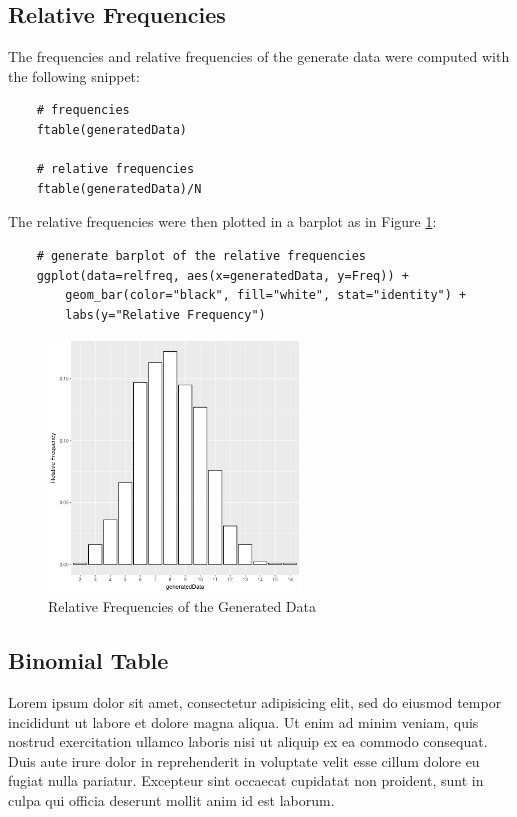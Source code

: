 \documentclass{article}
\begin{document}
        \subsection{Relative Frequencies}
            The frequencies and relative frequencies of the generate data were computed with the following snippet:
\begin{lstlisting}
    # frequencies
    ftable(generatedData)

    # relative frequencies
    ftable(generatedData)/N
\end{lstlisting}

            The relative frequencies were then plotted in a barplot as in Figure \ref{fig:relfreq}:
\begin{lstlisting}
    # generate barplot of the relative frequencies
    ggplot(data=relfreq, aes(x=generatedData, y=Freq)) + 
        geom_bar(color="black", fill="white", stat="identity") +
        labs(y="Relative Frequency")
\end{lstlisting}

            \begin{figure}[h]
                \begin{center}
                    \includegraphics[width=0.6\textwidth]{relfreq.png}
                    \caption{Relative Frequencies of the Generated Data} \label{fig:relfreq}
                \end{center}
            \end{figure}

        \subsection{Binomial Table}
        Lorem ipsum dolor sit amet, consectetur adipisicing elit, sed do eiusmod
        tempor incididunt ut labore et dolore magna aliqua. Ut enim ad minim veniam,
        quis nostrud exercitation ullamco laboris nisi ut aliquip ex ea commodo
        consequat. Duis aute irure dolor in reprehenderit in voluptate velit esse
        cillum dolore eu fugiat nulla pariatur. Excepteur sint occaecat cupidatat non
        proident, sunt in culpa qui officia deserunt mollit anim id est laborum.
\end{document}
